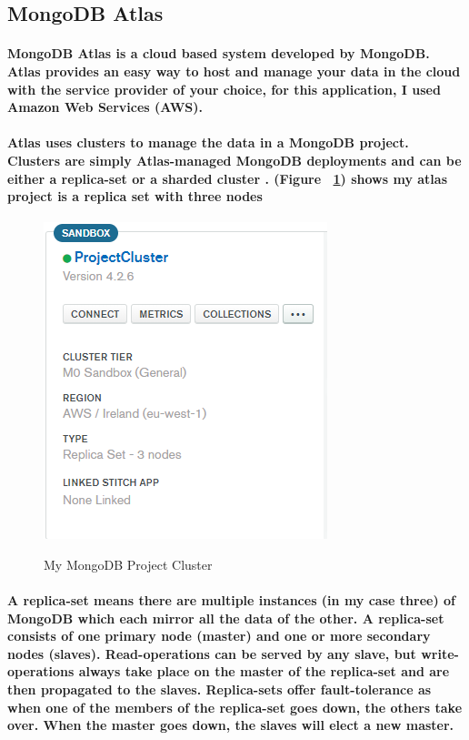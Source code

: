 \subsection{MongoDB Atlas}
\paragraph{MongoDB Atlas is a cloud based system developed by MongoDB. Atlas provides an easy way to host and manage your data in the cloud with the service provider of your choice, for this application, I used Amazon Web Services (AWS).}
\paragraph{Atlas uses clusters to manage the data in a MongoDB project. Clusters are simply Atlas-managed MongoDB deployments and can be either a replica-set or a sharded cluster \cite{Mongo:clusters}. (Figure ~\ref{mongo3_label}) shows my atlas project is a replica set with three nodes}
\begin{figure}[h]
    \centering
    \includegraphics[scale=0.4]{Images/mongo3.png} 
    \label{mongo3_label}
    \caption{My MongoDB Project Cluster}
\end{figure}
\paragraph{A replica-set means there are multiple instances (in my case three) of MongoDB which each mirror all the data of the other. A replica-set consists of one primary node (master) and one or more secondary nodes (slaves). Read-operations can be served by any slave, but write-operations always take place on the master of the replica-set and are then propagated to the slaves. Replica-sets offer fault-tolerance as when one of the members of the replica-set goes down, the others take over. When the master goes down, the slaves will elect a new master.}
\newpage
